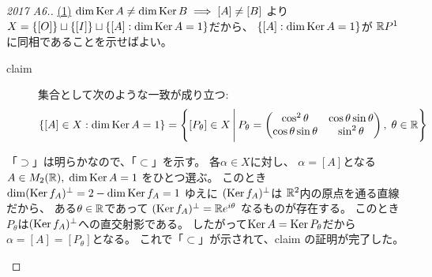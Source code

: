 \documentclass[report]{jlreq}
\begin{document}
%
\begin{proof}[2017 A6.]
    \uline{(1)} \quad
    $\dim \operatorname{\mathrm{Ker}} A \neq \dim \operatorname{\mathrm{Ker}} B \implies [A] \neq [B]$
    より
    $X = \{ [O] \} \sqcup \{ [I] \} \sqcup \{ [A] : \dim \operatorname{\mathrm{Ker}} A = 1 \}$だから、
    $\{ [A] : \dim \operatorname{\mathrm{Ker}} A = 1 \}$が
    $\mathbb{R} P^1$に同相であることを示せばよい。
    \begin{description}
        \item[claim] 集合として次のような一致が成り立つ:
            \begin{equation}
                \{ [A] \in X : \dim \operatorname{\mathrm{Ker}} A = 1 \}
                    =
                        \left\{{
                            \left[{
                                P_\theta
                            }\right]
                            \in X
                            \, \Bigg| \,
                            P_\theta =
                                \begin{pmatrix}
                                    \cos^2 \theta & \cos \theta \sin \theta \\
                                    \cos \theta \sin \theta & \sin^2 \theta
                                \end{pmatrix}, \;
                            \theta \in \mathbb{R}
                        }\right\}
            \end{equation}
    \end{description}
    \begin{innerproof}
        「$\supset$」は明らかなので、「$\subset$」を示す。
        各$\alpha \in X$に対し、
        $\alpha = [A]$となる$A \in M_2(\mathbb{R}), \; \dim \operatorname{\mathrm{Ker}} A = 1$
        をひとつ選ぶ。
        このとき
        $\dim (\operatorname{\mathrm{Ker}} f_A)^\perp = 2 - \dim \operatorname{\mathrm{Ker}} f_A = 1$
        ゆえに
        $(\operatorname{\mathrm{Ker}} f_A)^\perp$は
        $\mathbb{R}^2$内の原点を通る直線だから、
        ある$\theta \in \mathbb{R}$であって
        $(\operatorname{\mathrm{Ker}} f_A)^\perp = \mathbb{R} e^{i\theta}$
        なるものが存在する。
        このとき
        $P_\theta$は$(\operatorname{\mathrm{Ker}} f_A)^\perp$への直交射影である。
        したがって$\operatorname{\mathrm{Ker}} A = \operatorname{\mathrm{Ker}} P_\theta$だから
        $\alpha = [A] = [P_\theta]$となる。
        これで「$\subset$」が示されて、claim の証明が完了した。
    \end{innerproof}


\end{proof}
\end{document}

